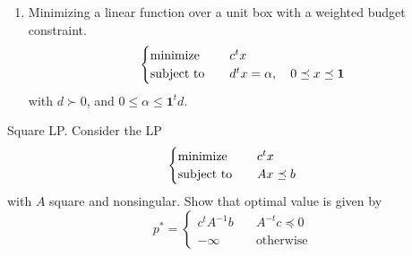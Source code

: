 \begin{problem}[4.8]
\begin{enumerate}
        \item Minimizing a linear function over a unit box with a weighted budget constraint.\[\begin{cases}
            \operatorname{minimize} \quad & c^tx \\
            \operatorname{subject\ to} \quad &d^tx = \alpha, \quad 0 \preceq x \preceq \textbf{1}
        \end{cases}\] with $d \succ 0$, and $0 \le \alpha \le \textbf{1}^td$.
    \end{enumerate}
\end{problem}

\begin{problem}[4.9]
    Square LP. Consider the LP \[\begin{cases}
        \operatorname{minimize} \quad &c^tx \\
        \operatorname{subject\ to} \quad &Ax \preceq b
    \end{cases}\] with $A$ square and nonsingular. Show that optimal value is given by \[p^* = \begin{cases}
        c^tA^{-1}b \quad &A^{-t}c \preceq 0\\
        -\infty \quad &\text{otherwise}
    \end{cases}\]
\end{problem}

